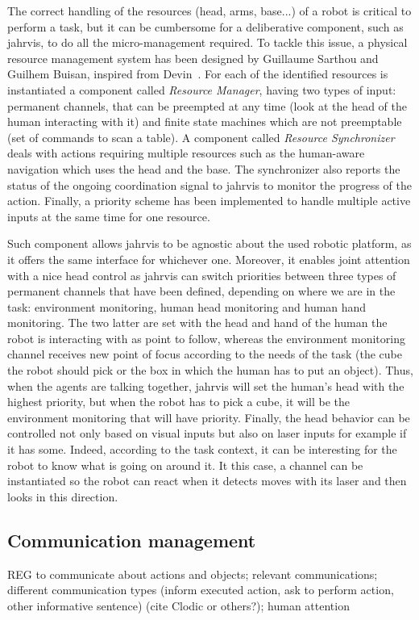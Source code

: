 \documentclass[a4paper,11pt,twoside]{StyleThese}
\begin{document}
The correct handling of the resources (head, arms, base...) of a robot is critical to perform a task, but it can be cumbersome for a deliberative component, such as \acrshort{jahrvis}, to do all the micro-management required. To tackle this issue, a physical resource management system has been designed by Guillaume Sarthou and Guilhem Buisan, inspired from Devin~\cite{devin_2017_decisional}. For each of the identified resources is instantiated a component called \emph{Resource Manager}, having two types of input: permanent channels, that can be preempted at any time (\eg look at the head of the human interacting with it) and finite state machines which are not preemptable (\eg set of commands to scan a table). A component called \emph{Resource Synchronizer} deals with actions requiring multiple resources such as the human-aware navigation which uses the head and the base. The synchronizer also reports the status of the ongoing coordination signal to \acrshort{jahrvis} to monitor the progress of the action. Finally, a priority scheme has been implemented to handle multiple active inputs at the same time for one resource. 

Such component allows \acrshort{jahrvis} to be agnostic about the used robotic platform, as it offers the same interface for whichever one. Moreover, it enables joint attention with a nice head control as \acrshort{jahrvis} can switch priorities between three types of permanent channels that have been defined, depending on where we are in the task: environment monitoring, human head monitoring and human hand monitoring. The two latter are set with the head and hand of the human the robot is interacting with as point to follow, whereas the environment monitoring channel receives new point of focus according to the needs of the task (\eg the cube the robot should pick or the box in which the human has to put an object). Thus, when the agents are talking together, \acrshort{jahrvis} will set the human's head with the highest priority, but when the robot has to pick a cube, it will be the environment monitoring that will have priority. Finally, the head behavior can be controlled not only based on visual inputs but also on laser inputs for example if it has some. Indeed, according to the task context, it can be interesting for the robot to know what is going on around it. It this case, a channel can be instantiated so the robot can react when it detects moves with its laser and then looks in this direction.

\subsection{Communication management}
REG to communicate about actions and objects;
relevant communications;
different communication types (inform executed action, ask to perform action, other informative sentence) (cite Clodic or others?);
human attention
\end{document}
